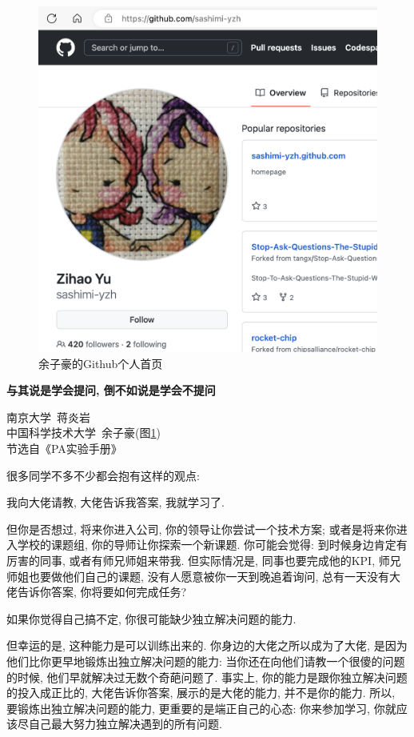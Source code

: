 \begin{figure}[!htbp]
	\centering
	\includegraphics[scale=0.4]{1-python-plim/figs/zihaoyu}
	\caption{余子豪的Github个人首页}
	\label{fig:yzh}
	
\end{figure}
\begin{pas}
	\begin{center}
		\large \textbf{与其说是学会提问, 倒不如说是学会不提问}
		
	\end{center}
	\begin{center}
		南京大学~蒋炎岩\\
		中国科学技术大学~余子豪(图\ref{fig:yzh})\\
		节选自《PA实验手册》
	\end{center}
	
	很多同学不多不少都会抱有这样的观点:

我向大佬请教, 大佬告诉我答案, 我就学习了.

但你是否想过, 将来你进入公司, 你的领导让你尝试一个技术方案; 或者是将来你进入学校的课题组, 你的导师让你探索一个新课题. 你可能会觉得: 到时候身边肯定有厉害的同事, 或者有师兄师姐来带我. 但实际情况是, 同事也要完成他的KPI, 师兄师姐也要做他们自己的课题, 没有人愿意被你一天到晚追着询问, 总有一天没有大佬告诉你答案, 你将要如何完成任务?

如果你觉得自己搞不定, 你很可能缺少独立解决问题的能力.

但幸运的是, 这种能力是可以训练出来的. 你身边的大佬之所以成为了大佬, 是因为他们比你更早地锻炼出独立解决问题的能力: 当你还在向他们请教一个很傻的问题的时候, 他们早就解决过无数个奇葩问题了. 事实上, 你的能力是跟你独立解决问题的投入成正比的, 大佬告诉你答案, 展示的是大佬的能力, 并不是你的能力. 所以, 要锻炼出独立解决问题的能力, 更重要的是端正自己的心态: 你来参加学习, 你就应该尽自己最大努力独立解决遇到的所有问题. 

\end{pas}


